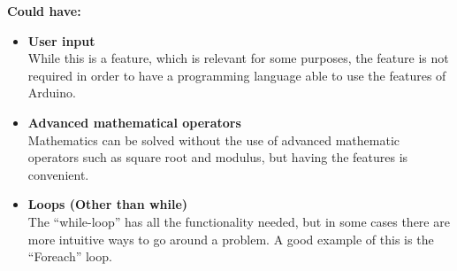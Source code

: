 \textbf{Could have:}
\begin{itemize}
\item \textbf{User input} \\
While this is a feature, which is relevant for some purposes, the feature is not required in order to have a programming language able to use the features of Arduino. \\

\item \textbf{Advanced mathematical operators} \\
Mathematics can be solved without the use of advanced mathematic operators such as square root and modulus, but having the features is convenient. \\

\item \textbf{Loops (Other than while)} \\
The ``while-loop'' has all the functionality needed, but in some cases there are more intuitive ways to go around a problem. A good example of this is the ``Foreach'' loop.\\
\end{itemize}